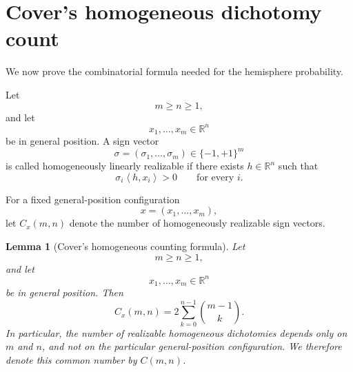 \documentclass[11pt]{article}
\newtheorem{lemma}[theorem]{Lemma}
\newcommand{\R}{\mathbb{R}}
\newcommand{\ip}[2]{\left\langle #1,#2\right\rangle}
\newcommand{\1}{\mathbf{1}}
\begin{document}
\section{Cover's homogeneous dichotomy count}

We now prove the combinatorial formula needed for the hemisphere
probability.

Let
\[
m\ge n\ge 1,
\]
and let
\[
x_1,\dots,x_m\in\R^n
\]
be in general position. A sign vector
\[
\sigma=(\sigma_1,\dots,\sigma_m)\in\{-1,+1\}^m
\]
is called homogeneously linearly realizable if there exists
\(h\in\R^n\) such that
\[
\sigma_i\ip{h}{x_i}>0
\qquad
\text{for every }i.
\]

For a fixed general-position configuration
\[
x=(x_1,\dots,x_m),
\]
let \(C_x(m,n)\) denote the number of homogeneously realizable sign
vectors.

\begin{lemma}[Cover's homogeneous counting formula]
\label{lem:cover}
Let
\[
m\ge n\ge1,
\]
and let
\[
x_1,\dots,x_m\in\R^n
\]
be in general position. Then
\begin{equation}
C_x(m,n)
=
2\sum_{k=0}^{n-1}\binom{m-1}{k}.
\label{eq:cover-formula}
\end{equation}
In particular, the number of realizable homogeneous dichotomies depends
only on \(m\) and \(n\), and not on the particular general-position
configuration. We therefore denote this common number by \(C(m,n)\).
\end{lemma}
\end{document}
